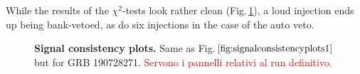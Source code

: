 \documentclass[binding=0.6cm, LaM]{sapthesis}
\newcommand{\fpg}[1]{\textcolor{red}{#1} }
\begin{document}
        While the results of the $\chi^2$-tests look rather clean (Fig.\,\ref{fig:scplots2}), a loud injection ends up being bank-vetoed,
        as do six injections in the case of the auto veto.
        \begin{figure}[!t]
          \noindent
          \label{scplots2}
          \centering
          \caption{\textbf{Signal consistency plots.} Same as Fig.$\ref{fig:signalconsistencyplots1}$ but for GRB 190728271. \fpg{Servono i pannelli relativi al run definitivo.}}
          \label{fig:scplots2}
        \end{figure}
\end{document}
